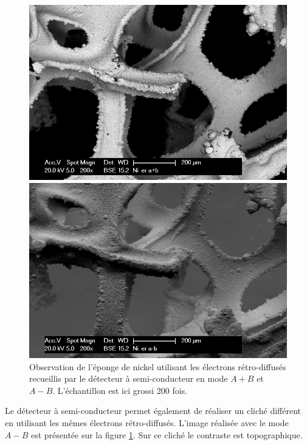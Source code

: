 \documentclass[a4paper,12pt]{article}
\begin{document}
\begin{figure}
\begin{minipage}[c]{.5\linewidth}
\centering
\includegraphics[width = 1 \textwidth]{images/ni_er_apb.png}
\end{minipage}
\begin{minipage}[c]{.5\linewidth}
\includegraphics[width = 1 \textwidth]{images/ni_er_amb.png}
\end{minipage}
\caption{Observation de l'éponge de nickel utilisant les électrons rétro-diffusés recueillis par le détecteur à semi-conducteur en mode $A+B$ et $A-B$. L'échantillon est ici grossi 200 fois.}
\label{fig:ni_er_apb_amb}
\end{figure}



Le détecteur à semi-conducteur permet également de réaliser un cliché différent en utilisant les mêmes électrons
rétro-diffusés. L'image réalisée avec le mode $A-B$ est présentée sur la figure \ref{fig:ni_er_apb_amb}. Sur ce cliché
le contraste est topographique.
\end{document}
